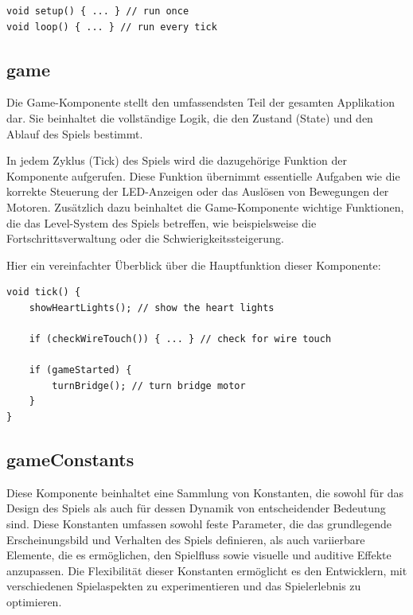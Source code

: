 \begin{minipage}{\linewidth}
\begin{lstlisting}[caption={Arduino spezifische Funktionen},captionpos=b]
void setup() { ... } // run once
void loop() { ... } // run every tick
\end{lstlisting}
\end{minipage}

\subsection{game}

Die Game-Komponente stellt den umfassendsten Teil der gesamten Applikation dar. Sie beinhaltet die vollständige Logik, die den Zustand (State) und den Ablauf des Spiels bestimmt.

In jedem Zyklus (Tick) des Spiels wird die dazugehörige Funktion der Komponente aufgerufen. Diese Funktion übernimmt essentielle Aufgaben wie die korrekte Steuerung der LED-Anzeigen oder das Auslösen von Bewegungen der Motoren. Zusätzlich dazu beinhaltet die Game-Komponente wichtige Funktionen, die das Level-System des Spiels betreffen, wie beispielsweise die Fortschrittsverwaltung oder die Schwierigkeitssteigerung.

Hier ein vereinfachter Überblick über die Hauptfunktion dieser Komponente:

\begin{minipage}{\linewidth}
\begin{lstlisting}[caption={Tick Funktion der game Komponente},captionpos=b]
void tick() {
    showHeartLights(); // show the heart lights

    if (checkWireTouch()) { ... } // check for wire touch
    
    if (gameStarted) {
        turnBridge(); // turn bridge motor
    }
}
\end{lstlisting}
\end{minipage}

\subsection{gameConstants}

Diese Komponente beinhaltet eine Sammlung von Konstanten, die sowohl für das Design des Spiels als auch für dessen Dynamik von entscheidender Bedeutung sind. Diese Konstanten umfassen sowohl feste Parameter, die das grundlegende Erscheinungsbild und Verhalten des Spiels definieren, als auch variierbare Elemente, die es ermöglichen, den Spielfluss sowie visuelle und auditive Effekte anzupassen. Die Flexibilität dieser Konstanten ermöglicht es den Entwicklern, mit verschiedenen Spielaspekten zu experimentieren und das Spielerlebnis zu optimieren.

